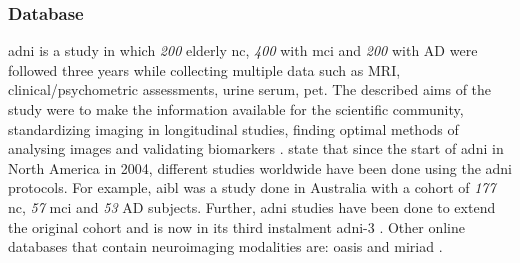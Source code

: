\subsubsection{Database} \label{database}

\gls{adni} is a study in which \textit{200} elderly \gls{nc}, \textit{400} with \gls{mci} and \textit{200} with \gls{AD} were followed three years while collecting multiple data such as \gls{MRI}, clinical/psychometric assessments, urine serum, \gls{pet}. The described aims of the study were to make the information available for the scientific community, standardizing imaging in longitudinal studies, finding optimal methods of analysing images and validating biomarkers \autocite{jack2008alzheimer}. \textcite{weiner2013alzheimer} state that since the start of \gls{adni} in North America in 2004, different studies worldwide have been done using the \gls{adni} protocols. For example, \gls{aibl} was a study done in Australia with a cohort of \textit{177} \gls{nc}, \textit{57} \gls{mci} and \textit{53} \gls{AD} subjects. Further, \gls{adni} studies have been done to extend the original cohort \autocite{weiner2013alzheimer} and is now in its third instalment \gls{adni}-3 \autocite{weiner2017alzheimer}.  
Other online databases that contain neuroimaging modalities are: \gls{oasis} \autocite{kurdi2017introducing} and \gls{miriad} \autocite{malone2013miriad}.


